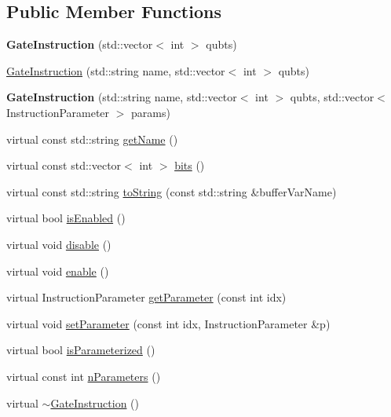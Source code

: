 \subsection*{Public Member Functions}
\begin{DoxyCompactItemize}
\item 
{\bfseries Gate\+Instruction} (std\+::vector$<$ int $>$ qubts)\hypertarget{a00112_a951ac3f44fcfbcf187bb73ba7438b472}{}\label{a00112_a951ac3f44fcfbcf187bb73ba7438b472}

\item 
\hyperlink{a00112_a9b8543b79576c69ab8578ab6228134d7}{Gate\+Instruction} (std\+::string name, std\+::vector$<$ int $>$ qubts)
\item 
{\bfseries Gate\+Instruction} (std\+::string name, std\+::vector$<$ int $>$ qubts, std\+::vector$<$ Instruction\+Parameter $>$ params)\hypertarget{a00112_a37aaeebdb14747b0afd7d00cf285343e}{}\label{a00112_a37aaeebdb14747b0afd7d00cf285343e}

\item 
virtual const std\+::string \hyperlink{a00112_a0db03b9e46eeba1134f0ca2b83ccc842}{get\+Name} ()
\item 
virtual const std\+::vector$<$ int $>$ \hyperlink{a00112_ad32ad03dfc516e00093030e60178003d}{bits} ()
\item 
virtual const std\+::string \hyperlink{a00112_a089a5da67ff40ac1a6f56e64589822d9}{to\+String} (const std\+::string \&buffer\+Var\+Name)
\item 
virtual bool \hyperlink{a00112_a0a821be322b0c848b01c55f91fc8f484}{is\+Enabled} ()
\item 
virtual void \hyperlink{a00112_a63ce138dd71fb43d303f5600fefb7215}{disable} ()
\item 
virtual void \hyperlink{a00112_a7a80474b7fd465271b3313432db2e608}{enable} ()
\item 
virtual Instruction\+Parameter \hyperlink{a00112_addd6185279fe99fbdc3d4efd96e42162}{get\+Parameter} (const int idx)
\item 
virtual void \hyperlink{a00112_afb8f7582d7520c77d61b9016753f5669}{set\+Parameter} (const int idx, Instruction\+Parameter \&p)
\item 
virtual bool \hyperlink{a00112_afe7aeeb398262931e156bcb3950f8188}{is\+Parameterized} ()
\item 
virtual const int \hyperlink{a00112_a3752912b2c402668ca4814e21d4bbd26}{n\+Parameters} ()
\item 
virtual \hyperlink{a00112_ab8a75144074b27262fc33c77db4528b7}{$\sim$\+Gate\+Instruction} ()
\end{DoxyCompactItemize}
